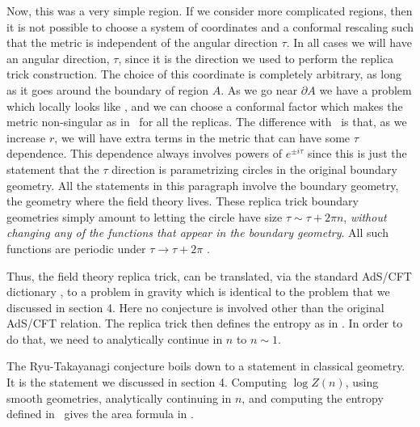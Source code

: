 Now, this was a very simple region. If we consider more complicated regions,
 then it is not possible to choose a
system of coordinates and a conformal rescaling such that the metric is
 independent of the angular direction $\tau$.
In all cases we will have an angular direction, $\tau$,
 since it is the direction we used to perform the replica trick construction. The choice of this coordinate
is completely arbitrary, as long as it goes around the boundary of region $A$.
As we go near $\partial A$ we have a problem which locally looks like \metrc , and we can
choose a conformal factor which makes the metric non-singular as in \metrc\ for all the replicas.
The difference with \metrc\ is that, as we increase $r$, we will have extra terms in the metric that can have
some $\tau$ dependence. This dependence  always involves powers of $e^{ \pm i\tau}$ since this is just the statement
that the $\tau$ direction is parametrizing circles in the original boundary geometry.
 All the statements in this paragraph
involve the boundary geometry, the geometry where the field theory lives. These  replica trick boundary geometries simply
amount to letting the circle have size $\tau \sim \tau + 2 \pi n $, {\it without changing any of the functions that
appear in the boundary geometry}. All such functions are periodic under $\tau \to \tau + 2 \pi $ .

Thus, the field theory replica trick, can be translated, via the  standard AdS/CFT
dictionary , to
a problem in gravity which is identical to the problem that we discussed in section 4. Here no conjecture is involved
other than the original AdS/CFT relation. The replica trick then defines the entropy as in \entrog . In order to do
that,  we need to analytically continue in $n$ to $n\sim 1$.

The Ryu-Takayanagi conjecture boils down to a statement in classical geometry. It is the statement we discussed
in section 4. Computing $\log Z(n)$, using smooth geometries,   analytically continuing in $n$, and
computing the entropy defined in \entrog\ gives the area formula in \RTconj .

